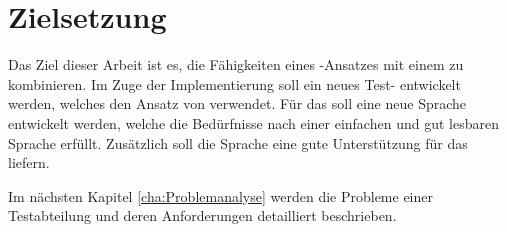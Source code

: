 
\section{Zielsetzung}

Das Ziel dieser Arbeit ist es, die Fähigkeiten eines -Ansatzes mit einem   zu kombinieren. Im Zuge der Implementierung soll ein neues Test- entwickelt werden, welches den Ansatz von  verwendet. Für das  soll eine neue Sprache entwickelt werden, welche die Bedürfnisse nach einer einfachen und gut lesbaren Sprache erfüllt. Zusätzlich soll die Sprache eine gute Unterstützung für das  liefern.

\SuperPar
Im nächsten Kapitel \ref{cha:Problemanalyse} werden die Probleme einer Testabteilung und deren Anforderungen detailliert beschrieben.
